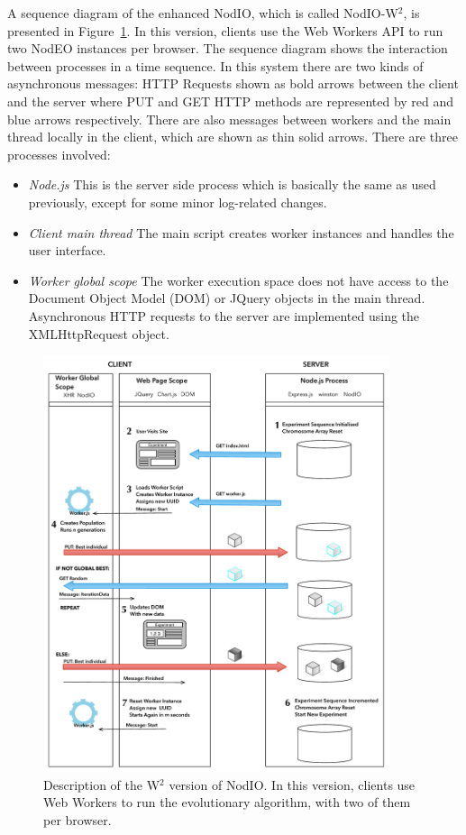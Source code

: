 \documentclass[journal,onecolumn]{IEEEtran}
\begin{document}
A sequence diagram   of the enhanced NodIO, which is called NodIO-W$^2$, is presented
in Figure~\ref{fig:system:w2}. In this version, clients use the Web Workers
API to run two {\sf NodEO} instances per browser. The sequence diagram shows the
interaction between processes in a time sequence. In this system there are
two kinds of asynchronous messages: HTTP Requests shown as bold arrows between
the client and the server where PUT and GET HTTP methods are represented by
red and blue arrows respectively. There are also messages between workers and
the main thread locally in the client, which are shown as thin solid arrows.
There are three processes involved:
\begin{itemize}
\item {\em Node.js} This is the server side process which is basically
  the same as used previously, except for some minor log-related
  changes. 
\item {\em Client main thread} The main script creates
worker instances and handles the user interface.
\item {\em Worker global scope} The worker execution space does not have
access to the Document Object Model (DOM) or JQuery objects in the main thread.
Asynchronous HTTP requests to the server are implemented using the
XMLHttpRequest object.  
\end{itemize}
%
\begin{figure}[!htb]
\centering
\includegraphics[width=4in]{Algorithm.pdf}
\caption{Description of the W$^2$ version of {\sf NodIO}. In this
  version, clients use Web Workers to run the evolutionary algorithm,
  with two of them per browser.}
\label{fig:system:w2}
\end{figure}
\end{document}
